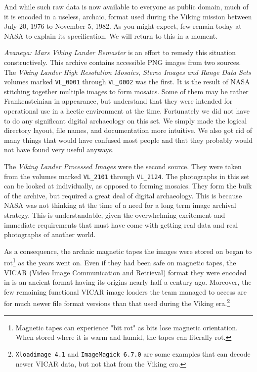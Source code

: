 And while such raw data is now available to everyone as public domain, much of it is encoded in a useless, archaic, format used during the Viking mission between July 20, 1976 to November 5, 1982. As you might expect, few remain today at NASA to explain its specification. We will return to this in a moment.

{\it Avaneya: Mars Viking Lander Remaster} is an effort to remedy this situation constructively. This archive contains accessible PNG images from two sources. The {\it Viking Lander High Resolution Mosaics, Stereo Images and Range Data Sets} volumes marked {\tt VL_0001} through {\tt VL_0002} was the first. It is the result of NASA stitching together multiple images to form mosaics. Some of them may be rather Frankensteinian in appearance, but understand that they were intended for operational use in a hectic environment at the time. Fortunately we did not have to do any significant digital archaeology on this set. We simply made the logical directory layout, file names, and documentation more intuitive. We also got rid of many things that would have confused most people and that they probably would not have found very useful anyways.

The {\it Viking Lander Processed Images} were the second source. They were taken from the volumes marked {\tt VL_2101} through {\tt VL_2124}. The photographs in this set can be looked at individually, as opposed to forming mosaics. They form the bulk of the archive, but required a great deal of digital archaeology. This is because NASA was not thinking at the time of a need for a long term image archival strategy. This is understandable, given the overwhelming excitement and immediate requirements that must have come with getting real data and real photographs of another world.

    {}

As a consequence, the archaic magnetic tapes the images were stored on began to rot\footnote{Magnetic tapes can experience "bit rot" as bits lose magnetic orientation. When stored where it is warm and humid, the tapes can literally rot.} as the years went on. Even if they had been safe on magnetic tapes, the VICAR (Video Image Communication and Retrieval) format they were encoded in is an ancient format having its origins nearly half a century ago. Moreover, the few remaining functional VICAR image loaders the team managed to access are for much newer file format versions than that used during the Viking era.\footnote{{\tt Xloadimage 4.1} and {\tt ImageMagick 6.7.0} are some examples that can decode newer VICAR data, but not that from the Viking era.}

